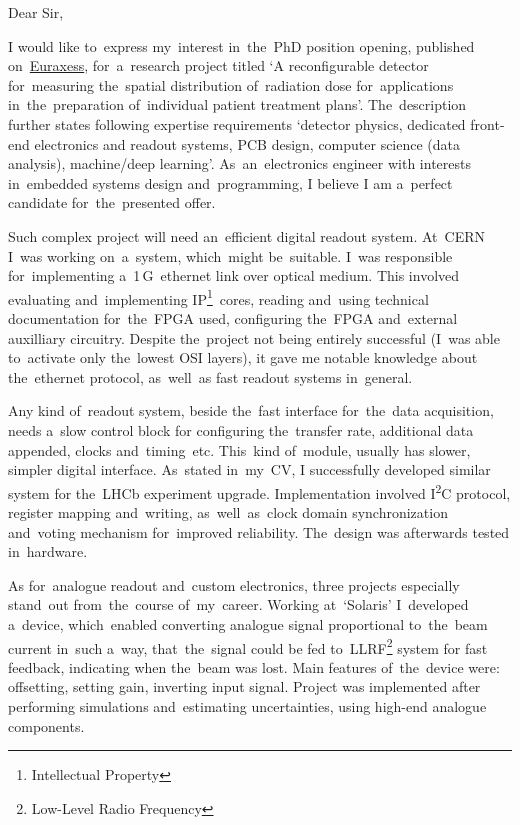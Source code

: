 \documentclass[11pt,a4paper,sans]{article}
\newcommand{\iic}{I\textsuperscript{2}C}
\begin{document}
	\noindent
	Dear Sir,
	\vspace{1\baselineskip}
	
	I would like to~express my~interest in~the~PhD position opening, published 
	on~\href{https://euraxess.ec.europa.eu/jobs/485237}{Euraxess}, for~a~research project
	titled `A reconfigurable detector for~measuring the~spatial distribution 
	of~radiation dose for~applications in~the~preparation of~individual patient treatment
	plans'. The~description further states following expertise requirements `detector physics,
	dedicated front-end electronics and readout systems, PCB design, computer science (data
	analysis), machine/deep learning'. As~an~electronics engineer with interests in~embedded 
	systems design and~programming, I believe I am a~perfect candidate for~the~presented offer.
	
	Such complex project will need an~efficient digital 
	readout	system. At~CERN I~was working on~a~system, which~might be~suitable. I~was responsible 
	for~implementing a~1$\,$G~ethernet link over optical medium. This involved evaluating
	and~implementing IP\footnote{Intellectual Property}~cores, reading and~using technical 
	documentation for~the~FPGA used, configuring the~FPGA and~external auxilliary circuitry. 
	Despite the~project not being
	entirely successful (I~was able to~activate only the~lowest OSI layers), it gave me 
	notable knowledge about the~ethernet protocol, as~well~as fast 
	readout systems in~general. 
	
	Any kind of~readout system, beside the~fast interface for~the~data acquisition, needs a~slow
	control block for configuring the~transfer rate, additional data appended, clocks 
	and~timing~etc. This~kind
	of~module, usually has slower, simpler digital interface. As~stated in~my~CV, I successfully
	developed similar system for the~LHCb experiment upgrade. Implementation involved \iic\space 
	protocol, register mapping and~writing, as~well~as~clock domain synchronization and~voting
	mechanism for~improved reliability. The~design was afterwards tested in~hardware.
	
	As for~analogue readout and~custom electronics, three projects especially stand~out 
	from~the~course of~my~career. Working at~`Solaris' I~developed a~device, which~enabled 
	converting analogue signal proportional to~the~beam current in~such a~way, that~the~signal
	could be fed to~LLRF\footnote{Low-Level Radio Frequency} system for fast feedback, indicating 
	when the~beam
	was lost. Main features of~the~device were: offsetting, setting gain, inverting input signal.
	Project was implemented after performing simulations and~estimating uncertainties, using 
	high-end analogue components.
	
\end{document}
